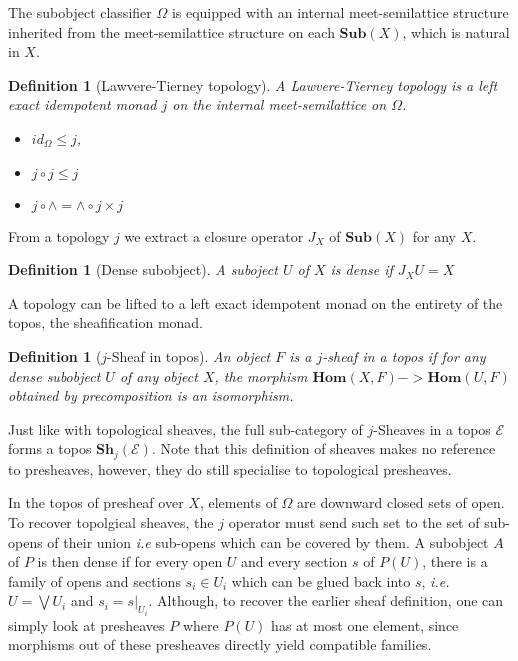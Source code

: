 \documentclass[11pt]{article}
\newtheorem{definition}[theorem]{Definition}
\newcommand{\0}{\mathbf{0}}
\newcommand{\1}{\mathbf{1}}
\begin{document}
The subobject classifier $\Omega$ is equipped with an internal meet-semilattice structure inherited from the meet-semilattice structure on each $\mathbf{Sub}(X)$, which is natural in $X$.

\begin{definition}[Lawvere-Tierney topology]
    A \emph{Lawvere-Tierney topology} is a left exact idempotent monad $j$ on the internal meet-semilattice on $\Omega$.
\begin{itemize}
    \item $ id_\Omega \leq j $,
    \item $ j\circ j \leq  j$
    \item $ j \circ \wedge = \wedge \circ j\times j$
\end{itemize}
\end{definition}

From a topology $j$ we extract a closure operator $J_X$ of $\mathbf{Sub}(X)$ for any $X$.
\begin{definition}[Dense subobject]
    A suboject $U$ of $X$ is dense if $J_XU  = X$
\end{definition}

A topology can be lifted to a left exact idempotent monad on the entirety of the topos, the sheafification monad.

\begin{definition}[$j$-Sheaf in topos]
    An object $F$ is a $j$-\emph{sheaf} in a topos if for any dense subobject $U$ of any object $X$, the morphism $\mathbf{Hom}(X, F) -> \mathbf{Hom}(U, F)$ obtained by precomposition is an isomorphism.
\end{definition}


Just like with topological sheaves, the full sub-category of $j$-Sheaves in a topos $\mathcal{E}$ forms a topos $\mathbf{Sh}_j(\mathcal{E})$. Note that this definition of sheaves makes no reference to presheaves, however, they do still specialise to topological presheaves.

In the topos of presheaf over $X$, elements of $\Omega$ are downward closed sets of open. To recover topolgical sheaves, the $j$ operator must send such set to the set of sub-opens of their union \emph{i.e} sub-opens which can be covered by them. A subobject $A$ of $P$ is then dense if for every open $U$ and every section $s$ of $P(U)$, there is a family of opens and sections $s_i\in U_i$ which can be glued back into $s$, \emph{i.e.} $U = \bigvee U_i$ and $s_i = s|_{U_i}$. Although, to recover the earlier sheaf definition, one can simply look at presheaves $P$ where $P(U)$ has at most one element, since morphisms out of these presheaves directly yield compatible families.
\end{document}
